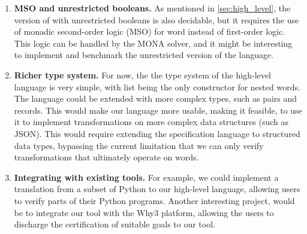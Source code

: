 \begin{enumerate}
    \item \textbf{MSO and unrestricted booleans.} As mentioned in
        \cref{sec:high_level}, the version of  with
        unrestricted booleans is also decidable, but it requires the use of
        monadic second-order logic (MSO) for word instead of first-order logic.
        This logic can be handled by the MONA solver, and it might be
        interesting to implement and benchmark the unrestricted version of the
        language.

    \item \textbf{Richer type system.} For now, the the type system of the
        high-level language is very simple, with list being the only
        constructor for nested words. The language could be extended with more
        complex types, such as pairs and records. This would make our language
        more usable, making it feasible, to use it to implement transformations
        on more complex data structures (such as JSON). This would require
        extending the specification language to structured data types,
        bypassing the current limitation that we can only verify
        transformations that ultimately operate on words.
    
    \item \textbf{Integrating with existing tools.} For
        example, we could implement a translation from a subset of Python to
        our high-level language, allowing users to verify parts of their Python
        programs. Another interesting project, would be to
        integrate our tool with the Why3 platform, allowing the users
        to discharge the certification of suitable goals to our tool.

\end{enumerate}
